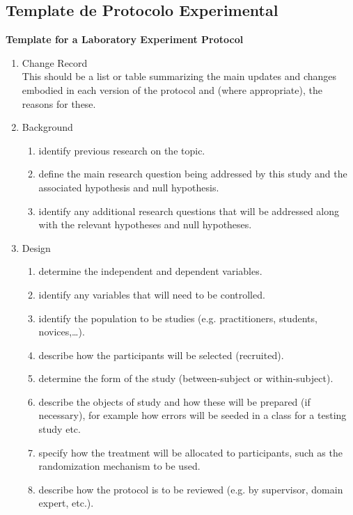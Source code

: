 \begin{anexosenv}

\partanexos

\chapter{Template de Protocolo Experimental}
\textbf{Template for a Laboratory Experiment Protocol}

\begin{enumerate}
\item Change Record \\

This should be a list or table summarizing the main updates and changes embodied in each version of the protocol and (where appropriate), the reasons for these.

\item Background
	\begin{enumerate}
	\item identify previous research on the topic.
	\item define the main research question being addressed by this study and the associated hypothesis and null hypothesis.
	\item identify any additional research questions that will be addressed along with the relevant hypotheses and null hypotheses.
	\end{enumerate}
\item Design
	\begin{enumerate}
	\item determine the independent and dependent variables.
	\item identify any variables that will need to be controlled.
	\item identify the population to be studies (e.g. practitioners, students, novices,…).
	\item describe how the participants will be selected (recruited).
	\item determine the form of the study (between-subject or within-subject).
	\item describe the objects of study and how these will be prepared (if necessary), for example how errors will be seeded in a class for a testing study etc.
	\item specify how the treatment will be allocated to participants, such as the randomization mechanism to be used.
	\item describe how the protocol is to be reviewed (e.g. by supervisor, domain expert, etc.).

\end{enumerate}
\end{enumerate}
\end{anexosenv}
